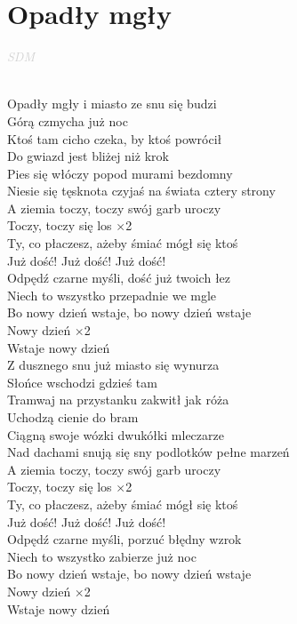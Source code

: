 \documentclass[a5paper, 10pt]{book}
\begin{document}
\newpage
\section{Opadły mgły}\textcolor{lightgray}{\textit{SDM}}\\~\\
\begin{minipage}[t]{0.7\textwidth}
Opadły mgły i miasto ze snu się budzi\\
Górą czmycha już noc\\
Ktoś tam cicho czeka, by ktoś powrócił\\
Do gwiazd jest bliżej niż krok\\
Pies się włóczy popod murami bezdomny\\
Niesie się tęsknota czyjaś na świata cztery strony\\

A ziemia toczy, toczy swój garb uroczy\\
Toczy, toczy się los
\hspace*{5mm} $\times $2\\

Ty, co płaczesz, ażeby śmiać mógł się ktoś\\
Już dość! Już dość! Już dość!\\
Odpędź czarne myśli, dość już twoich łez\\
Niech to wszystko przepadnie we mgle\\

Bo nowy dzień wstaje, bo nowy dzień wstaje\\
Nowy dzień \hspace*{16mm} $\times $2\\
Wstaje nowy dzień\\

Z dusznego snu już miasto się wynurza\\
Słońce wschodzi gdzieś tam\\
Tramwaj na przystanku zakwitł jak róża\\
Uchodzą cienie do bram\\
Ciągną swoje wózki dwukółki mleczarze\\
Nad dachami snują się sny podlotków pełne marzeń\\

A ziemia toczy, toczy swój garb uroczy\\
Toczy, toczy się los
\hspace*{5mm} $\times $2\\

Ty, co płaczesz, ażeby śmiać mógł się ktoś\\
Już dość! Już dość! Już dość!\\
Odpędź czarne myśli, porzuć błędny wzrok\\
Niech to wszystko zabierze już noc\\

Bo nowy dzień wstaje, bo nowy dzień wstaje\\
Nowy dzień \hspace*{15mm} $\times $2\\
Wstaje nowy dzień\\
\end{minipage}
\end{document}
